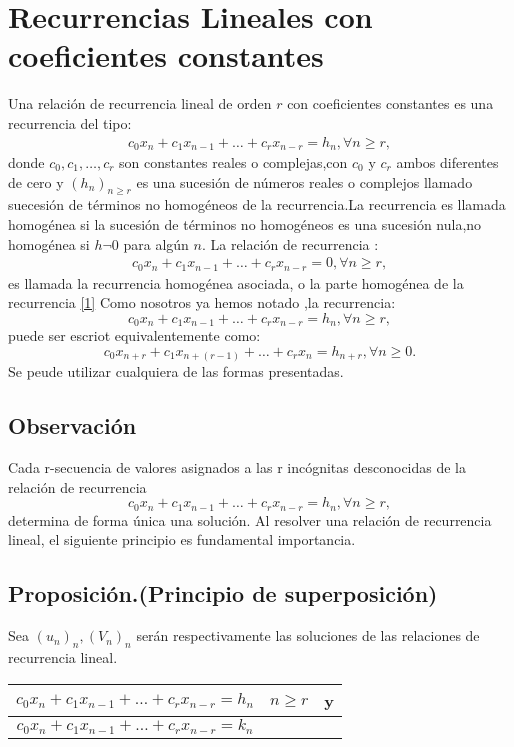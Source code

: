 \documentclass[a4,paper]{article}
\begin{document}
\section{Recurrencias Lineales con coeficientes constantes}
Una relación de recurrencia lineal de orden $ r $ con coeficientes constantes es una recurrencia del tipo:
\begin{align}\label{1}
c_{0}x_{n}+c_{1}x_{n-1}+\ldots+c_{r}x_{n-r}=h_{n}, \forall n \geq r,
\end{align}
donde $ c_{0},c_{1},\ldots,c_{r} $ son constantes reales o complejas,con $ c_{0} $ y $ c_{r} $ ambos diferentes de cero y $ (h_{n})_{n \geq r} $ es una sucesión de números reales o complejos llamado suecesión de términos no 
homogéneos de la recurrencia.La recurrencia es llamada homogénea si la sucesión de términos no homogéneos es una sucesión nula,no homogénea si $ h\neg 0 $ para algún $ n $.
La relación de recurrencia :
\begin{align}\label{2}
c_{0}x_{n}+c_{1}x_{n-1}+\ldots+c_{r}x_{n-r}=0, \forall n \geq r,
\end{align}
es llamada la recurrencia homogénea asociada, o la parte homogénea de la recurrencia \ref{1}
Como nosotros ya hemos notado ,la recurrencia:
$$
c_{0}x_{n}+c_{1}x_{n-1}+\ldots+c_{r}x_{n-r}=h_{n}, \forall n\geq r,
$$
puede ser escriot equivalentemente como:
$$
c_{0}x_{n+r}+c_{1}x_{n+(r-1)}+\ldots+c_{r}x_{n}=h_{n+r}, \forall n\geq 0.
$$
Se peude utilizar cualquiera de las formas presentadas.
\subsection*{Observación}%

Cada r-secuencia de valores asignados a las r incógnitas desconocidas de la
relación de recurrencia 
$$
c_{0}x_{n}+c_{1}x_{n-1}+\ldots+c_{r}x_{n-r}=h_{n}, \forall n\geq r,
$$
determina de forma única una solución.
Al resolver una relación de recurrencia lineal, el siguiente principio es fundamental
importancia.
\subsection*{Proposición.(Principio de superposición)}
Sea $ (u_{n})_n,(V_{n})_{n} $ serán respectivamente las soluciones de las relaciones de recurrencia lineal.
\begin{tabular}{|c|c|c|}
	\hline 
	$c_{0}x_{n}+c_{1}x_{n-1}+\ldots+c_{r}x_{n-r}=h_{n}$&$ n\geq r  $  & y \\ 
	\hline 
	$c_{0}x_{n}+c_{1}x_{n-1}+\ldots+c_{r}x_{n-r}=k_{n}$& $  $  &  \\ 
	\hline 
\end{tabular} 
\end{document}
